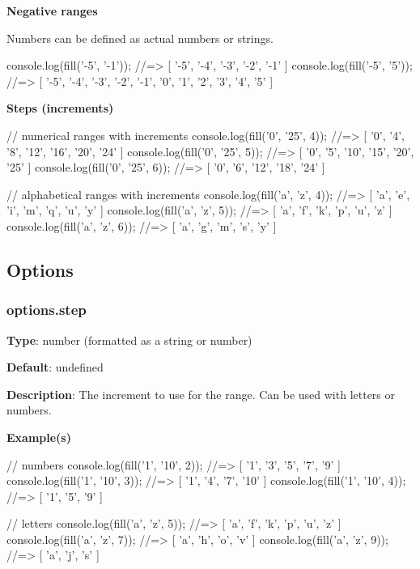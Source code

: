 {\bfseries Negative ranges}

Numbers can be defined as actual numbers or strings.


\begin{DoxyCode}
console.log(fill('-5', '-1')); //=> [ '-5', '-4', '-3', '-2', '-1' ]
console.log(fill('-5', '5')); //=> [ '-5', '-4', '-3', '-2', '-1', '0', '1', '2', '3', '4', '5' ]
\end{DoxyCode}


{\bfseries Steps (increments)}


\begin{DoxyCode}
// numerical ranges with increments
console.log(fill('0', '25', 4)); //=> [ '0', '4', '8', '12', '16', '20', '24' ]
console.log(fill('0', '25', 5)); //=> [ '0', '5', '10', '15', '20', '25' ]
console.log(fill('0', '25', 6)); //=> [ '0', '6', '12', '18', '24' ]

// alphabetical ranges with increments
console.log(fill('a', 'z', 4)); //=> [ 'a', 'e', 'i', 'm', 'q', 'u', 'y' ]
console.log(fill('a', 'z', 5)); //=> [ 'a', 'f', 'k', 'p', 'u', 'z' ]
console.log(fill('a', 'z', 6)); //=> [ 'a', 'g', 'm', 's', 'y' ]
\end{DoxyCode}


\subsection*{Options}

\subsubsection*{options.\+step}

{\bfseries Type}\+: {\ttfamily number} (formatted as a string or number)

{\bfseries Default}\+: {\ttfamily undefined}

{\bfseries Description}\+: The increment to use for the range. Can be used with letters or numbers.

{\bfseries Example(s)}


\begin{DoxyCode}
// numbers
console.log(fill('1', '10', 2)); //=> [ '1', '3', '5', '7', '9' ]
console.log(fill('1', '10', 3)); //=> [ '1', '4', '7', '10' ]
console.log(fill('1', '10', 4)); //=> [ '1', '5', '9' ]

// letters
console.log(fill('a', 'z', 5)); //=> [ 'a', 'f', 'k', 'p', 'u', 'z' ]
console.log(fill('a', 'z', 7)); //=> [ 'a', 'h', 'o', 'v' ]
console.log(fill('a', 'z', 9)); //=> [ 'a', 'j', 's' ]
\end{DoxyCode}


